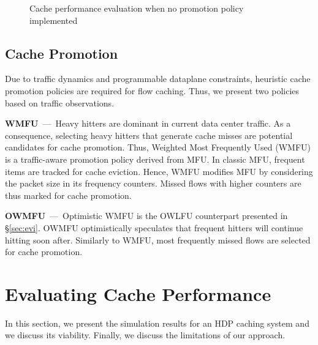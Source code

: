 \begin{figure}[]
{		\label{fig:weighted_hit_ratio_sf10}
	}
	\caption{Cache performance evaluation when no promotion policy implemented}
	\label{fig:hit_ratio}
\end{figure}


\subsection{Cache Promotion}
Due to traffic dynamics and programmable dataplane constraints, heuristic cache promotion policies are required for flow caching.
Thus, we present two policies based on traffic observations.

\textbf{WMFU}~---~Heavy hitters are dominant in current data center traffic.
As a consequence, selecting heavy hitters that generate cache misses are potential candidates for cache promotion.
Thus, Weighted Most Frequently Used (WMFU) is a traffic-aware promotion policy derived from MFU.
In classic MFU, frequent items are tracked for cache eviction.
Hence, WMFU modifies MFU by considering the packet size in its frequency counters.
Missed flows with higher counters are thus marked for cache promotion.

\textbf{OWMFU}~---~Optimistic WMFU is the OWLFU counterpart presented in \S\ref{sec:evi}.
OWMFU optimistically speculates that frequent hitters will continue hitting soon after.
Similarly to WMFU, most frequently missed flows are selected for cache promotion.



\section{Evaluating Cache Performance}\label{sec:cache_results}
In this section, we present the simulation results for an HDP caching system and we discuss its viability.
Finally, we discuss the limitations of our approach.


